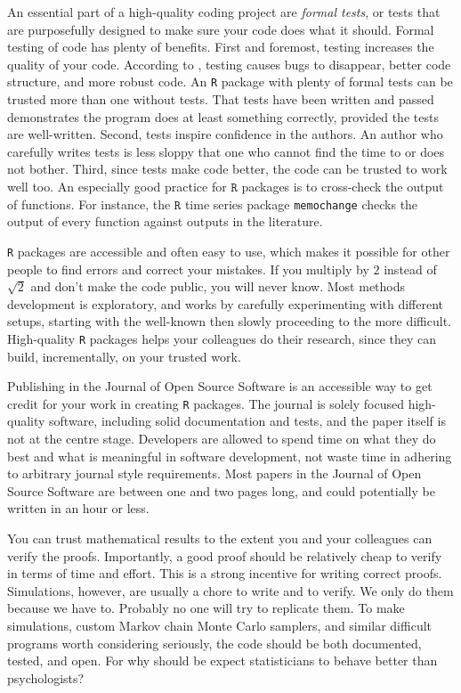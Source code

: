 An essential part of a high-quality coding project are \emph{formal tests}, or tests that are purposefully designed to make sure your code does what it should. Formal testing of code has plenty of benefits. First and foremost, testing increases the quality of your code. According to \textcite[Chapter 7]{Wickham2015-ik}, testing causes bugs to disappear, better code structure, and more robust code. An \texttt{R} package with plenty of formal tests can be trusted more than one without tests. That tests have been written and passed demonstrates the program does at least something correctly, provided the tests are well-written. Second, tests inspire confidence in the authors. An author who carefully writes tests is less sloppy that one who cannot find the time to or does not bother. Third, since tests make code better, the code can be trusted to work well too. An especially good practice for $\mathtt{R}$ packages is to cross-check the output of functions. For instance, the $\mathtt{R}$ time series package \texttt{memochange} \parencite{memochange} checks the output of every function against outputs in the literature.

\texttt{R} packages are accessible and often easy to use, which makes it possible for other people to find errors and correct your mistakes. If you multiply by $2$ instead of $\sqrt{2}$ and don't make the code public, you will never know. Most methods development is exploratory, and works by carefully experimenting with different setups, starting with the well-known then slowly proceeding to the more difficult. High-quality \texttt{R} packages helps your colleagues do their research, since they can build, incrementally, on your trusted work.  

Publishing in the Journal of Open Source Software is an accessible way to get credit for your work in creating \texttt{R} packages. The journal is solely focused high-quality software, including solid documentation and tests, and the paper itself is not at the centre stage. Developers are allowed to spend time on what they do best and what is meaningful in software development, not waste time in adhering to arbitrary journal style requirements. Most papers in the Journal of Open Source Software are between one and two pages long, and could potentially be written in an hour or less. 

You can trust mathematical results to the extent you and your colleagues can verify the proofs. Importantly, a good proof should be relatively cheap to verify in terms of time and effort. This is a strong incentive for writing correct proofs. Simulations, however, are usually a chore to write and to verify. We only do them because we have to. Probably no one will try to replicate them. To make simulations, custom Markov chain Monte Carlo samplers, and similar difficult programs worth considering seriously, the code should be both documented, tested, and open. For why should be expect statisticians to behave better than psychologists?

